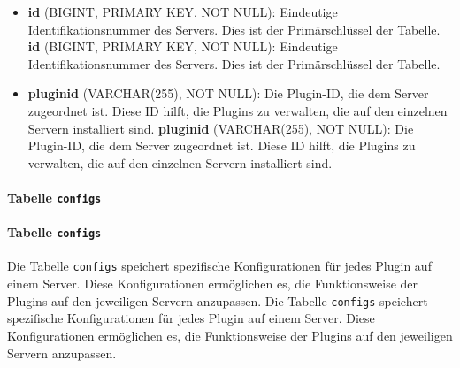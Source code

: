 \begin{itemize}
\item
  \textbf{id} (BIGINT, PRIMARY KEY, NOT NULL): Eindeutige Identifikationsnummer des Servers. Dies ist der Primärschlüssel der Tabelle.
  \textbf{id} (BIGINT, PRIMARY KEY, NOT NULL): Eindeutige Identifikationsnummer des Servers. Dies ist der Primärschlüssel der Tabelle.
\item
  \textbf{pluginid} (VARCHAR(255), NOT NULL): Die Plugin-ID, die dem Server zugeordnet ist. Diese ID hilft, die Plugins zu verwalten, die auf den einzelnen Servern installiert sind.
  \textbf{pluginid} (VARCHAR(255), NOT NULL): Die Plugin-ID, die dem Server zugeordnet ist. Diese ID hilft, die Plugins zu verwalten, die auf den einzelnen Servern installiert sind.
\end{itemize}

\paragraph{\texorpdfstring{Tabelle \texttt{configs}}{Tabelle configs}}\label{tabelle-configs}
\paragraph{\texorpdfstring{Tabelle \texttt{configs}}{Tabelle configs}}\label{tabelle-configs}

Die Tabelle \texttt{configs} speichert spezifische Konfigurationen für jedes Plugin auf einem Server. Diese Konfigurationen ermöglichen es, die Funktionsweise der Plugins auf den jeweiligen Servern anzupassen.
Die Tabelle \texttt{configs} speichert spezifische Konfigurationen für jedes Plugin auf einem Server. Diese Konfigurationen ermöglichen es, die Funktionsweise der Plugins auf den jeweiligen Servern anzupassen.

